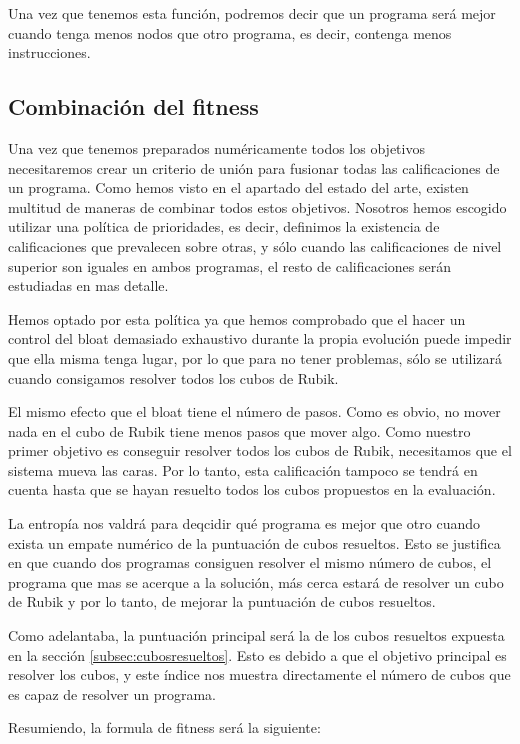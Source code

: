 Una vez que tenemos esta función, podremos decir que un programa será mejor
cuando tenga menos nodos que otro programa, es decir, contenga menos
instrucciones.

\subsection{Combinación del fitness}\label{subsec:combinacion-fitness}

Una vez que tenemos preparados numéricamente todos los objetivos necesitaremos
crear un criterio de unión para fusionar todas las calificaciones de un programa.
Como hemos visto en el apartado del estado del arte, existen multitud de maneras
de combinar todos estos objetivos. Nosotros hemos escogido utilizar una política
de prioridades, es decir, definimos la existencia de calificaciones que
prevalecen sobre otras, y sólo cuando las calificaciones de nivel superior son
iguales en ambos programas, el resto de calificaciones serán estudiadas en mas
detalle.

Hemos optado por esta política ya que hemos comprobado que el hacer un control
del bloat demasiado exhaustivo durante la propia evolución puede impedir que ella
misma tenga lugar, por lo que para no tener problemas, sólo se utilizará cuando
consigamos resolver todos los cubos de Rubik.

El mismo efecto que el bloat tiene el número de pasos. Como es obvio, no mover
nada en el cubo de Rubik tiene menos pasos que mover algo. Como nuestro primer
objetivo es conseguir resolver todos los cubos de Rubik, necesitamos que el
sistema mueva las caras. Por lo tanto, esta calificación tampoco se tendrá en
cuenta hasta que se hayan resuelto todos los cubos propuestos en la evaluación.

La entropía nos valdrá para deqcidir qué programa es mejor que otro cuando exista
un empate numérico de la puntuación de cubos resueltos. Esto se justifica en que
cuando dos programas consiguen resolver el mismo número de cubos, el programa que
mas se acerque a la solución, más cerca estará de resolver un cubo de Rubik y por
lo tanto, de mejorar la puntuación de cubos resueltos.

Como adelantaba, la puntuación principal será la de los cubos resueltos expuesta
en la sección \ref{subsec:cubosresueltos}. Esto es debido a que el objetivo
principal es resolver los cubos, y este índice nos muestra directamente el número de cubos que es capaz de
resolver un programa.

Resumiendo, la formula de fitness será la siguiente:

